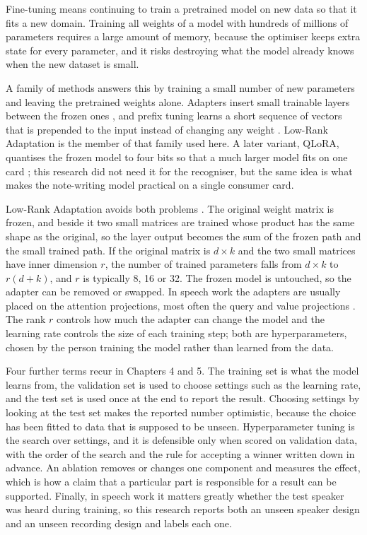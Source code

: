 Fine-tuning means continuing to train a pretrained model on new data so that it fits a
new domain. Training all weights of a model with hundreds of millions of parameters
requires a large amount of memory, because the optimiser keeps extra state for every
parameter, and it risks destroying what the model already knows when the new dataset is
small.

A family of methods answers this by training a small number of new parameters and leaving
the pretrained weights alone. Adapters insert small trainable layers between the frozen
ones \cite{houlsby2019adapters}, and prefix tuning learns a short sequence of vectors that
is prepended to the input instead of changing any weight \cite{li2021prefix}. Low-Rank
Adaptation is the member of that family used here. A later variant, QLoRA, quantises the
frozen model to four bits so that a much larger model fits on one card
\cite{dettmers2023qlora}; this research did not need it for the recogniser, but the same
idea is what makes the note-writing model practical on a single consumer card.

Low-Rank Adaptation avoids both problems \cite{hu2022lora}. The original weight matrix is
frozen, and beside it two small matrices are trained whose product has the same shape as
the original, so the layer output becomes the sum of the frozen path and the small
trained path. If the original matrix is $d \times k$ and the two small matrices have inner
dimension $r$, the number of trained parameters falls from $d \times k$ to $r(d + k)$, and
$r$ is typically 8, 16 or 32. The frozen model is untouched, so the adapter can be removed
or swapped. In speech work the adapters are usually placed on the attention projections,
most often the query and value projections \cite{yang2025spt}. The rank $r$ controls how
much the adapter can change the model and the learning rate controls the size of each
training step; both are hyperparameters, chosen by the person training the model rather
than learned from the data.

Four further terms recur in Chapters 4 and 5. The training set is what the model learns
from, the validation set is used to choose settings such as the learning rate, and the
test set is used once at the end to report the result. Choosing settings by looking at the
test set makes the reported number optimistic, because the choice has been fitted to data
that is supposed to be unseen. Hyperparameter tuning is the search over settings, and it
is defensible only when scored on validation data, with the order of the search and the
rule for accepting a winner written down in advance. An ablation removes or changes one
component and measures the effect, which is how a claim that a particular part is
responsible for a result can be supported. Finally, in speech work it matters greatly
whether the test speaker was heard during training, so this research reports both an unseen
speaker design and an unseen recording design and labels each one.

